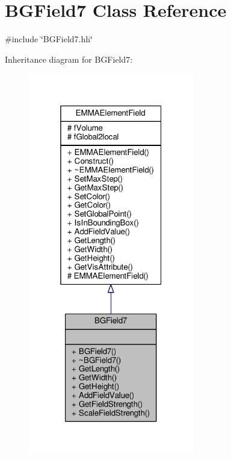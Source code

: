 \hypertarget{classBGField7}{}\section{B\+G\+Field7 Class Reference}
\label{classBGField7}


{\ttfamily \#include \char`\"{}B\+G\+Field7.\+hh\char`\"{}}



Inheritance diagram for B\+G\+Field7\+:
\nopagebreak
\begin{figure}[H]
\begin{center}
\leavevmode
\includegraphics[width=205pt]{classBGField7__inherit__graph}
\end{center}
\end{figure}


